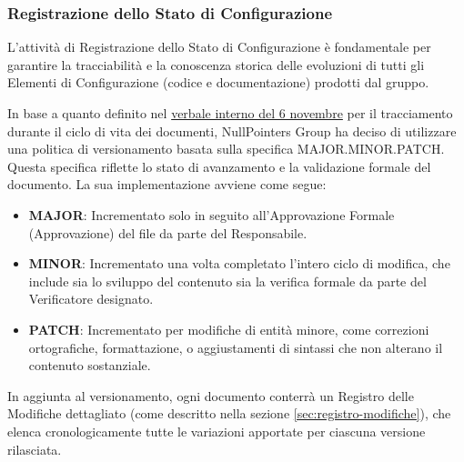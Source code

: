 \subsubsection{Registrazione dello Stato di Configurazione}
L'attività di Registrazione dello Stato di Configurazione è fondamentale per garantire la tracciabilità e la conoscenza storica delle evoluzioni di tutti gli Elementi di Configurazione (codice e documentazione) prodotti dal gruppo.

In base a quanto definito nel \href{https://nullpointersgroup.github.io/Documentazione/output/RTB/Verbali%20Interni/2025-11-06_verbale_interno.pdf}{verbale interno del 6 novembre} per il tracciamento durante il ciclo di vita dei documenti, NullPointers Group ha deciso di utilizzare una politica di versionamento basata sulla specifica MAJOR.MINOR.PATCH. Questa specifica riflette lo stato di avanzamento e la validazione formale del documento. La sua implementazione avviene come segue:
\begin{itemize}[itemsep=3pt, parsep=1pt, label=$\scriptstyle\bullet$]
    \item \textbf{MAJOR}: Incrementato solo in seguito all'Approvazione Formale (Approvazione) del file da parte del Responsabile.
    \item \textbf{MINOR}: Incrementato una volta completato l'intero ciclo di modifica, che include sia lo sviluppo del contenuto sia la verifica formale da parte del Verificatore designato.
    \item \textbf{PATCH}: Incrementato per modifiche di entità minore, come correzioni ortografiche, formattazione, o aggiustamenti di sintassi che non alterano il contenuto sostanziale.
\end{itemize}
In aggiunta al versionamento, ogni documento conterrà un Registro delle Modifiche dettagliato (come descritto nella sezione \ref{sec:registro-modifiche}), che elenca cronologicamente tutte le variazioni apportate per ciascuna versione rilasciata.


